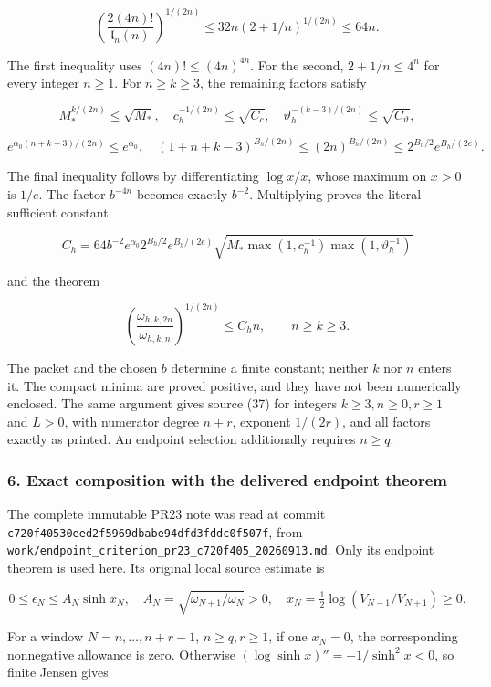 \[
\left(\frac{2(4n)!}{\mathfrak l_n(n)}\right)^{1/(2n)}
\le32n(2+1/n)^{1/(2n)}\le64n.
\]

The first inequality uses \((4n)!\le(4n)^{4n}\). For the second, \(2+1/n\le4^n\) for every integer \(n\ge1\). For \(n\ge k\ge3\), the remaining factors satisfy

\[
M_*^{k/(2n)}\le\sqrt{M_*},\quad
c_h^{-1/(2n)}\le\sqrt{C_c},\quad
\vartheta_h^{-(k-3)/(2n)}\le\sqrt{C_\vartheta},
\]

\[
e^{\alpha_0(n+k-3)/(2n)}\le e^{\alpha_0},\quad
(1+n+k-3)^{B_h/(2n)}\le(2n)^{B_h/(2n)}
\le2^{B_h/2}e^{B_h/(2e)}.
\]

The final inequality follows by differentiating \(\log x/x\), whose maximum on \(x>0\) is \(1/e\). The factor \(b^{-4n}\) becomes exactly \(b^{-2}\). Multiplying proves the literal sufficient constant

\[
\boxed{C_h=64b^{-2}e^{\alpha_0}2^{B_h/2}e^{B_h/(2e)}
\sqrt{M_*\max(1,c_h^{-1})\max(1,\vartheta_h^{-1})}}
\]

and the theorem

\[
\boxed{\left(\frac{\omega_{h,k,2n}}{\omega_{h,k,n}}\right)^{1/(2n)}\le C_hn,
\qquad n\ge k\ge3.}
\]

The packet and the chosen \(b\) determine a finite constant; neither \(k\) nor \(n\) enters it. The compact minima are proved positive, and they have not been numerically enclosed. The same argument gives source (37) for integers \(k\ge3,n\ge0,r\ge1\) and \(L>0\), with numerator degree \(n+r\), exponent \(1/(2r)\), and all factors exactly as printed. An endpoint selection additionally requires \(n\ge q\).

\subsubsection{6. Exact composition with the delivered endpoint theorem}\label{endpoint-arithmetic_intake--exact-composition-with-the-delivered-endpoint-theorem}

The complete immutable PR23 note was read at commit \nolinkurl{c720f40530eed2f5969dbabe94dfd3fddc0f507f}, from \nolinkurl{work/endpoint_criterion_pr23_c720f405_20260913.md}. Only its endpoint theorem is used here. Its original local source estimate is

\[
0\le\epsilon_N\le A_N\sinh x_N,\quad
A_N=\sqrt{\omega_{N+1}/\omega_N}>0,\quad
x_N=\tfrac12\log(V_{N-1}/V_{N+1})\ge0.
\]

For a window \(N=n,\ldots,n+r-1\), \(n\ge q,r\ge1\), if one \(x_N=0\), the corresponding nonnegative allowance is zero. Otherwise \((\log\sinh x)''=-1/\sinh^2x<0\), so finite Jensen gives

